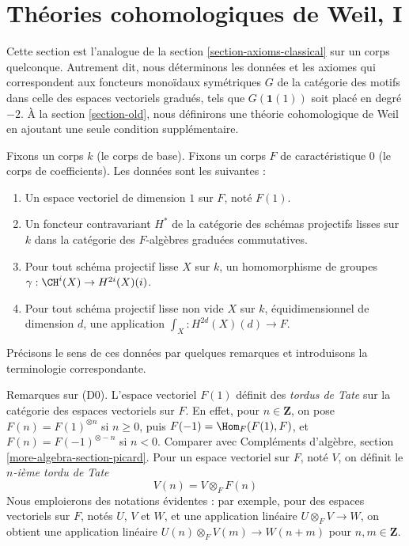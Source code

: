 














\section{Théories cohomologiques de Weil, I}
\label{section-axioms}

\noindent
Cette section est l'analogue de la section \ref{section-axioms-classical}
sur un corps quelconque. Autrement dit, nous déterminons les données
et les axiomes qui correspondent aux foncteurs monoïdaux symétriques $G$
de la catégorie des motifs dans celle des espaces vectoriels gradués, tels que
$G(\mathbf{1}(1))$ soit placé en degré $-2$. À la section \ref{section-old},
nous définirons une théorie cohomologique de Weil en ajoutant une seule
condition supplémentaire.

\medskip\noindent
Fixons un corps $k$ (le corps de base).
Fixons un corps $F$ de caractéristique $0$ (le corps de coefficients).
Les données sont les suivantes :
\begin{enumerate}
\item[(D0)] Un espace vectoriel de dimension $1$ sur $F$, noté $F(1)$.
\item[(D1)] Un foncteur contravariant $H^*$ de la catégorie
des schémas projectifs lisses sur $k$ dans la catégorie des
$F$-algèbres graduées commutatives.
\item[(D2)] Pour tout schéma projectif lisse $X$ sur $k$,
un homomorphisme de groupes $\gamma : \CH^i(X) \to H^{2i}(X)(i)$.
\item[(D3)] Pour tout schéma projectif lisse non vide $X$ sur $k$,
équidimensionnel de dimension $d$, une application
$\int_X : H^{2d}(X)(d) \to F$.
\end{enumerate}
Précisons le sens de ces données par quelques remarques
et introduisons la terminologie correspondante.

\medskip\noindent
Remarques sur (D0).
L'espace vectoriel $F(1)$ définit des {\it tordus de Tate} sur la catégorie
des espaces vectoriels sur $F$. En effet, pour $n \in \mathbf{Z}$, on pose
$F(n) = F(1)^{\otimes n}$ si $n \geq 0$, puis $F(-1) = \Hom_F(F(1), F)$,
et $F(n) = F(-1)^{\otimes - n}$ si $n < 0$. Comparer avec
Compléments d'algèbre, section \ref{more-algebra-section-picard}.
Pour un espace vectoriel sur $F$, noté $V$, on définit le {\it $n$-ième tordu de Tate}
$$
V(n) = V \otimes_F F(n)
$$
Nous emploierons des notations évidentes : par exemple, pour des espaces vectoriels sur $F$, notés $U$, $V$
et $W$, et une application linéaire $U \otimes_F V \to W$, on obtient une application
linéaire $U(n) \otimes_F V(m) \to W(n + m)$ pour $n, m \in \mathbf{Z}$.

